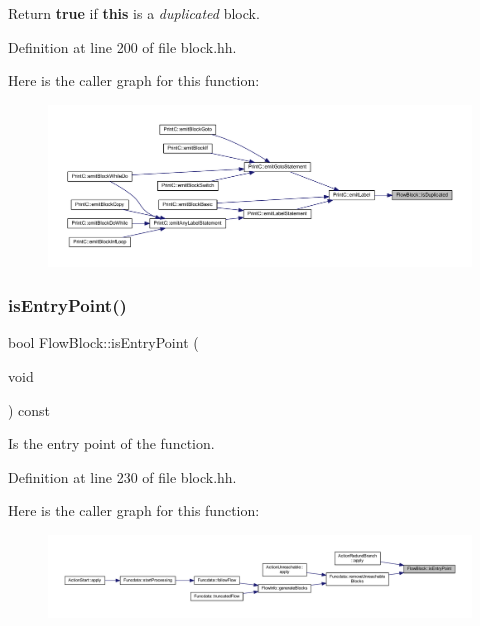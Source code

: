 Return {\bfseries{true}} if {\bfseries{this}} is a {\itshape duplicated} block. 



Definition at line 200 of file block.\+hh.

Here is the caller graph for this function\+:
\nopagebreak
\begin{figure}[H]
\begin{center}
\leavevmode
\includegraphics[width=350pt]{class_flow_block_a62d5d1a34bb6725a102a58f937c54930_icgraph}
\end{center}
\end{figure}
\mbox{\label{class_flow_block_a3dbd95abe3b349bdfc87a89350fe21e5}} 
\subsubsection{\texorpdfstring{isEntryPoint()}{isEntryPoint()}}
{\footnotesize\ttfamily bool Flow\+Block\+::is\+Entry\+Point (\begin{DoxyParamCaption}\item[{void}]{ }\end{DoxyParamCaption}) const\hspace{0.3cm}{\ttfamily [inline]}}



Is the entry point of the function. 



Definition at line 230 of file block.\+hh.

Here is the caller graph for this function\+:
\nopagebreak
\begin{figure}[H]
\begin{center}
\leavevmode
\includegraphics[width=350pt]{class_flow_block_a3dbd95abe3b349bdfc87a89350fe21e5_icgraph}
\end{center}
\end{figure}
\mbox{\label{class_flow_block_aabe712161d0f64bcf0a8f98329b19419}} 
